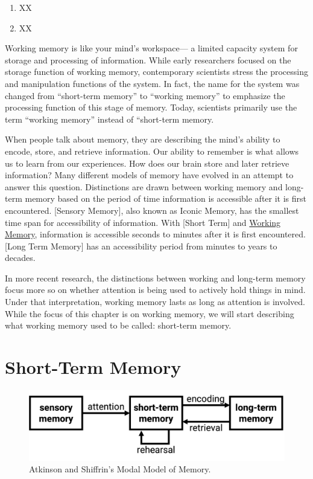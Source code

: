 \documentclass[
]{krantz}
\providecommand{\tightlist}{%
  \setlength{\itemsep}{0pt}\setlength{\parskip}{0pt}}
\begin{document}
\begin{enumerate}
\def\labelenumi{\arabic{enumi}.}
\tightlist
\item
  XX
\item
  XX
\end{enumerate}

Working memory is like your mind's workspace--- a limited capacity system for storage and processing of information. While early researchers focused on the storage function of working memory, contemporary scientists stress the processing and manipulation functions of the system. In fact, the name for the system was changed from ``short-term memory'' to ``working memory'' to emphasize the processing function of this stage of memory. Today, scientists primarily use the term ``working memory'' instead of ``short-term memory.

When people talk about memory, they are describing the mind's ability to encode, store, and retrieve information. Our ability to remember is what allows us to learn from our experiences. How does our brain store and later retrieve information? Many different models of memory have evolved in an attempt to answer this question. Distinctions are drawn between working memory and long-term memory based on the period of time information is accessible after it is first encountered. {[}Sensory Memory{]}, also known as Iconic Memory, has the smallest time span for accessibility of information. With {[}Short Term{]} and \protect\hyperlink{working-memory}{Working Memory}, information is accessible seconds to minutes after it is first encountered. {[}Long Term Memory{]} has an accessibility period from minutes to years to decades.

In more recent research, the distinctions between working and long-term memory focus more so on whether attention is being used to actively hold things in mind. Under that interpretation, working memory lasts as long as attention is involved. While the focus of this chapter is on working memory, we will start describing what working memory used to be called: short-term memory.

\hypertarget{short-term-memory}{%
\section{Short-Term Memory}\label{short-term-memory}}

\begin{figure}

{\centering \includegraphics[width=0.6\linewidth]{images/ch4/fig1} 

}

\caption{Atkinson and Shiffrin’s Modal Model of Memory.}\label{fig:modalmodel}
\end{figure}
\end{document}
